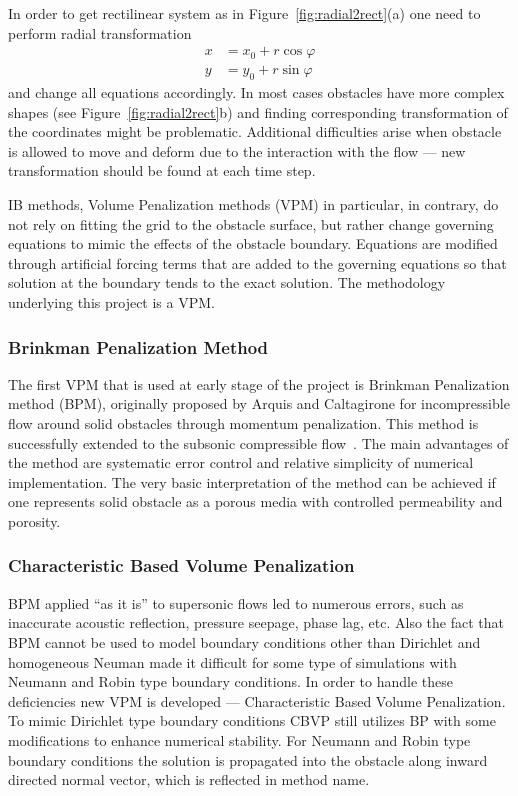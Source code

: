 In order to get rectilinear system as in Figure~\ref{fig:radial2rect}(a) one need to perform radial transformation
\begin{align*}
x &= x_0 + r\cos \varphi \\
y &= y_0 + r\sin \varphi
\end{align*}
and change all equations accordingly. In most cases obstacles have more complex shapes (see Figure~\ref{fig:radial2rect}b) and finding corresponding transformation of the coordinates might be problematic. Additional difficulties arise when obstacle is allowed to move and deform due to the interaction with the flow --- new transformation should be found at each time step.

IB methods, Volume Penalization methods (VPM) in particular, in contrary, do not rely on fitting the grid to the obstacle surface, but rather change governing equations to mimic the effects of the obstacle boundary. Equations are modified through artificial forcing terms that are added to the governing equations so that solution at the boundary tends to the exact solution. The methodology underlying this project is a VPM.
\subsubsection{Brinkman Penalization Method}
\label{sec:brinkman_penal_chapter1}
The first VPM that is used at early stage of the project is Brinkman Penalization method (BPM), originally proposed by Arquis and Caltagirone \cite{lib:vp_brink} for incompressible flow around solid obstacles through momentum penalization. This method is successfully extended to the subsonic compressible flow~\cite{lib:vp_liu}. The main advantages of the method are systematic error control and relative simplicity of numerical implementation. The very basic interpretation of the method can be achieved if one represents solid obstacle as a porous media with controlled permeability and porosity.

\subsubsection{Characteristic Based Volume Penalization}
BPM applied ``as it is'' to supersonic flows led to numerous errors, such as inaccurate acoustic reflection, pressure seepage, phase lag, etc. Also the fact that BPM cannot be used to model boundary conditions other than Dirichlet and homogeneous Neuman made it difficult for some type of simulations with Neumann and Robin type boundary conditions. In order to handle these deficiencies new VPM is developed --- Characteristic Based Volume Penalization. To mimic Dirichlet type boundary conditions CBVP still utilizes BP with some modifications to enhance numerical stability. For Neumann and Robin type boundary conditions the solution is propagated into the obstacle along inward directed normal vector, which is reflected in method name. 

